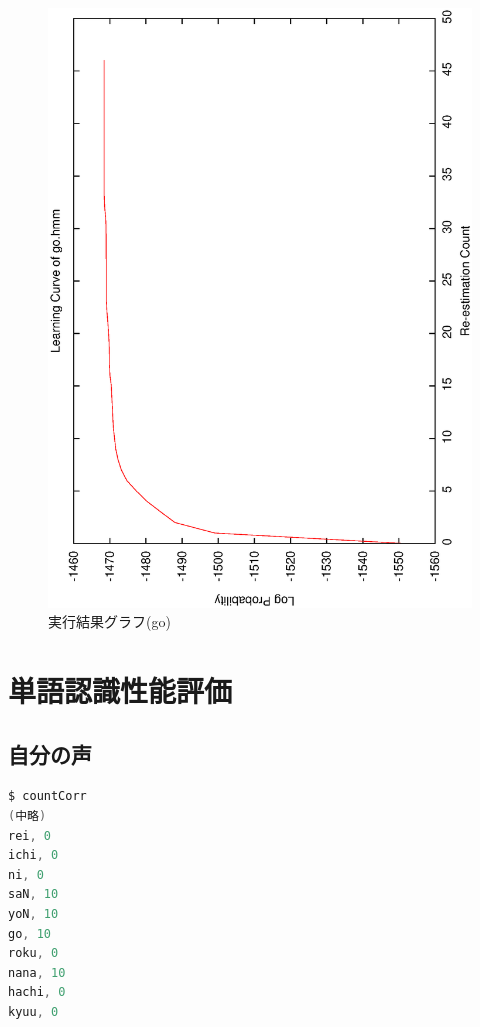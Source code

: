 \documentclass[11pt,a4paper, uplatex]{jsarticle}
\begin{document}
\begin{figure}[h]
  \begin{center}
    \includegraphics[width=13.0cm]{learningCurve.ps}
    \caption{実行結果グラフ(go)}
    \label{fig:ps}
  \end{center}
\end{figure}

\section{単語認識性能評価}
\subsection{自分の声}
\begin{lstlisting}[language=c, caption=\texttt{countCorr}実行結果]
$ countCorr
(中略)
rei, 0
ichi, 0
ni, 0
saN, 10
yoN, 10
go, 10
roku, 0
nana, 10
hachi, 0
kyuu, 0
\end{lstlisting}
\end{document}
